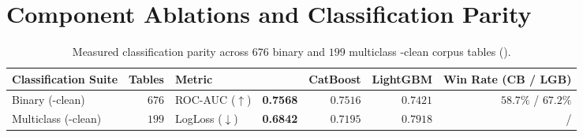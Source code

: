 \section{Component Ablations and Classification Parity}
\label{sec:ablations}

\begin{table}[t]
\centering
\sffamily\footnotesize\lining
\setlength\tabcolsep{4.5pt}
\begin{tabularx}{\linewidth}{@{}Lrlrrrr@{}}
\toprule
Classification Suite & Tables & Metric & \EZ{} & CatBoost & LightGBM & Win Rate (CB / LGB) \\
\midrule
Binary (-clean) & $676$ & ROC-AUC ($\uparrow$) & \textbf{0.7568} & $0.7516$ & $0.7421$ & $58.7\%$ / $67.2\%$ \\
Multiclass (-clean) & $199$ & LogLoss ($\downarrow$) & \textbf{0.6842} & $0.7195$ & $0.7918$ & \textbf{\BHMulticlassWinCat{}} / \textbf{\BHMulticlassWinLGBM{}} \\
\bottomrule
\end{tabularx}
\caption{Measured classification parity across $676$ binary and $199$ multiclass -clean corpus tables ().}
\label{tab:classification}
\end{table}

